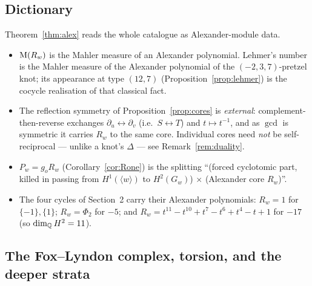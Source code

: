 \subsection*{Dictionary}

\begin{rem}\label{rem:dict}
Theorem~\ref{thm:alex} reads the whole catalogue as Alexander-module data.
\begin{itemize}
\item[(i)] $\operatorname{M}(R_w)$ is the Mahler measure of an Alexander polynomial. Lehmer's number is
the Mahler measure of the Alexander polynomial of the $(-2,3,7)$-pretzel knot; its appearance at
type $(12,7)$ (Proposition~\ref{prop:lehmer}) is the cocycle realisation of that classical fact.
\item[(ii)] The reflection symmetry of Proposition~\ref{prop:cores} is \emph{external}:
complement-then-reverse exchanges $\partial_u\leftrightarrow\partial_v$ (i.e.\ $S\leftrightarrow T$)
and $t\mapsto t^{-1}$, and as $\gcd$ is symmetric it carries $R_w$ to the same core. Individual
cores need \emph{not} be self-reciprocal --- unlike a knot's $\Delta$ --- see
Remark~\ref{rem:duality}.
\item[(iii)] $P_w=g_o R_w$ (Corollary~\ref{cor:Rone}) is the splitting ``(forced cyclotomic
part, killed in passing from $H^1(\langle w\rangle)$ to $H^2(G_w)$) $\times$ (Alexander core
$R_w$)''.
\item[(iv)] The four cycles of Section~2 carry their Alexander polynomials: $R_w=1$ for
$\{-1\},\{1\}$; $R_w=\Phi_2$ for $-5$; and $R_w=t^{11}-t^{10}+t^{7}-t^{6}+t^{4}-t+1$ for $-17$
(so $\dim_{\mathbb{Q}} H^2=11$).
\end{itemize}
\end{rem}

\subsection*{The Fox--Lyndon complex, torsion, and the deeper strata}

